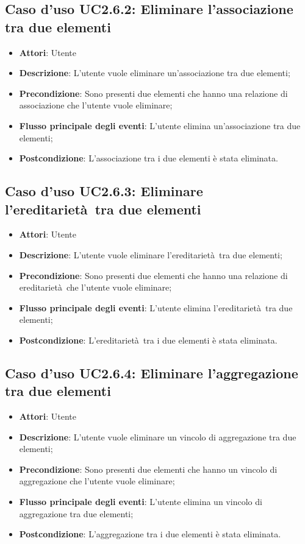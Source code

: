 \documentclass[../AnalisiDeiRequisiti.tex]{subfiles}
\begin{document}
		\subsection{Caso d'uso UC2.6.2: Eliminare l'associazione tra due elementi}
		\begin{itemize}
			\item \textbf{Attori}: Utente
			\item \textbf{Descrizione}: L'utente vuole eliminare un'associazione tra due elementi;
			\item \textbf{Precondizione}: Sono presenti due elementi che hanno una relazione di associazione che l'utente vuole eliminare;
			\item \textbf{Flusso principale degli eventi}: L'utente elimina un'associazione tra due elementi;
			\item \textbf{Postcondizione}: L'associazione tra i due elementi è stata eliminata.
		\end{itemize}
		\subsection{Caso d'uso UC2.6.3: Eliminare l'ereditarietà tra due elementi}
		\begin{itemize}
			\item \textbf{Attori}: Utente
			\item \textbf{Descrizione}: L'utente vuole eliminare l'ereditarietà tra due elementi;
			\item \textbf{Precondizione}: Sono presenti due elementi che hanno una relazione di ereditarietà che l'utente vuole eliminare;
			\item \textbf{Flusso principale degli eventi}: L'utente elimina l'ereditarietà tra due elementi;
			\item \textbf{Postcondizione}: L'ereditarietà tra i due elementi è stata eliminata.
		\end{itemize}
		\subsection{Caso d'uso UC2.6.4: Eliminare l'aggregazione tra due elementi}
		\begin{itemize}
			\item \textbf{Attori}: Utente
			\item \textbf{Descrizione}: L'utente vuole eliminare un vincolo di aggregazione tra due elementi;
			\item \textbf{Precondizione}: Sono presenti due elementi che hanno un vincolo di aggregazione che l'utente vuole eliminare;
			\item \textbf{Flusso principale degli eventi}: L'utente elimina un vincolo di aggregazione tra due elementi;
			\item \textbf{Postcondizione}: L'aggregazione tra i due elementi è stata eliminata.
		\end{itemize}
\end{document}
